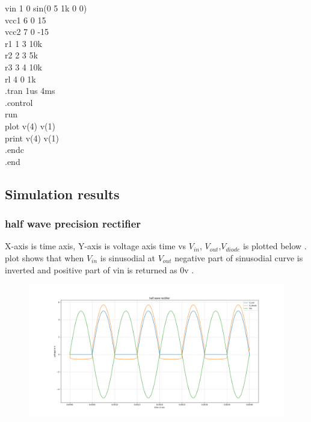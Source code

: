 \documentclass[12pt]{article}
\begin{document}
vin 1 0 sin(0 5 1k 0 0)\\
vcc1 6 0 15\\
vcc2 7 0 -15\\
r1 1 3 10k\\
r2 2 3 5k\\
r3 3 4 10k\\
rl 4 0 1k\\
.tran 1us 4ms\\  
.control\\
run\\
plot v(4) v(1)\\
print v(4) v(1)\\
.endc \\
.end\\
\newpage


\subsection{Simulation results}
\subsubsection{half wave precision rectifier}
X-axis is time axis, Y-axis is voltage axis time vs \(V_{in}\), \(V_{out}\),\(V_{diode}\) is plotted below . plot shows that when \(V_{in}\) is sinusodial at \(V_{out}\) negative part of sinusodial curve is inverted and  positive part of vin is returned as 0v .\\
\begin{figure}[h!]
\centering
\includegraphics[scale = 0.4]{half_wave_rect_plot.png}
\end{figure}
\newpage
\end{document}
